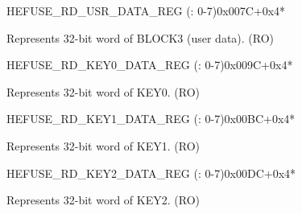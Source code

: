 \begin{register}{H}{EFUSE\_RD\_USR\_DATA\_REG (: 0-7)}{0x007C+0x4*}\label{regdesc:EFUSERDUSRDATANREG}
%
\regnewline%
\begin{regdesc}\begin{reglist}
\label{fielddesc:EFUSEUSRDATAN}\item [EFUSE\_USR\_DATA\regindex{n}] Represents 32-bit word  of BLOCK3 (user data). (RO)
\end{reglist}\end{regdesc}
\end{register}


\begin{register}{H}{EFUSE\_RD\_KEY0\_DATA\_REG (: 0-7)}{0x009C+0x4*}\label{regdesc:EFUSERDKEY0DATANREG}
%
\regnewline%
\begin{regdesc}\begin{reglist}
\label{fielddesc:EFUSEKEY0DATAN}\item [EFUSE\_KEY0\_DATA\regindex{n}] Represents 32-bit word  of KEY0. (RO)
\end{reglist}\end{regdesc}
\end{register}


\begin{register}{H}{EFUSE\_RD\_KEY1\_DATA\_REG (: 0-7)}{0x00BC+0x4*}\label{regdesc:EFUSERDKEY1DATANREG}
%
\regnewline%
\begin{regdesc}\begin{reglist}
\label{fielddesc:EFUSEKEY1DATAN}\item [EFUSE\_KEY1\_DATA\regindex{n}] Represents 32-bit word  of KEY1. (RO)
\end{reglist}\end{regdesc}
\end{register}


\begin{register}{H}{EFUSE\_RD\_KEY2\_DATA\_REG (: 0-7)}{0x00DC+0x4*}\label{regdesc:EFUSERDKEY2DATANREG}
%
\regnewline%
\begin{regdesc}\begin{reglist}
\label{fielddesc:EFUSEKEY2DATAN}\item [EFUSE\_KEY2\_DATA\regindex{n}] Represents 32-bit word  of KEY2. (RO)
\end{reglist}\end{regdesc}
\end{register}


